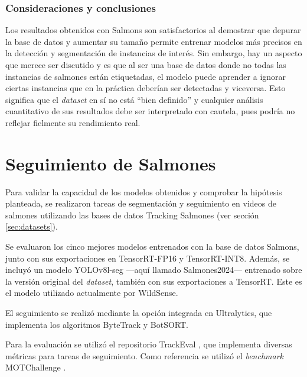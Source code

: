 \subsubsection{Consideraciones y conclusiones}
Los resultados obtenidos con Salmons son satisfactorios al demostrar que depurar la base de datos y aumentar su tamaño permite entrenar modelos más precisos en la detección y segmentación de instancias de interés. Sin embargo, hay un aspecto que merece ser discutido y es que al ser una base de datos donde no todas las instancias de salmones están etiquetadas, el modelo puede aprender a ignorar ciertas instancias que en la práctica deberían ser detectadas y viceversa. Esto significa que el \textit{dataset} en sí no está ``bien definido'' y cualquier análisis cuantitativo de sus resultados debe ser interpretado con cautela, pues podría no reflejar fielmente su rendimiento real.


\section{Seguimiento de Salmones}
Para validar la capacidad de los modelos obtenidos y comprobar la hipótesis planteada, se realizaron tareas de segmentación y seguimiento en videos de salmones utilizando las bases de datos Tracking Salmones (ver sección \ref{sec:datasets}).

Se evaluaron los cinco mejores modelos entrenados con la base de datos Salmons, junto con sus exportaciones en TensorRT-FP16 y TensorRT-INT8. Además, se incluyó un modelo YOLOv8l-seg ---aquí llamado Salmones2024--- entrenado sobre la versión original del \textit{dataset}, también con sus exportaciones a TensorRT. Este es el modelo utilizado actualmente por WildSense.

El seguimiento se realizó mediante la opción integrada en Ultralytics, que implementa los algoritmos ByteTrack y BotSORT.

Para la evaluación se utilizó el repositorio TrackEval \cite{TrackEval}, que implementa diversas métricas para tareas de seguimiento. Como referencia se utilizó el \textit{benchmark} MOTChallenge \cite{MOTChallenge}. 

